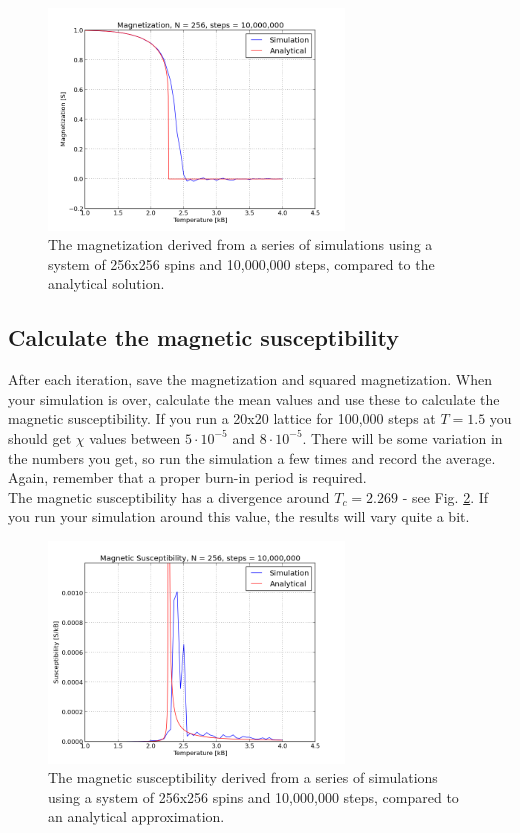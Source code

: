 \documentclass{article}
\begin{document}
\begin{figure}[p]
  \centering
  \includegraphics[width=0.7\textwidth]{mag_anal.png}
  \caption{The magnetization derived from a series of simulations using a system of
  256x256 spins and 10,000,000 steps, compared to the analytical solution.}
  \label{fig:magnetization}
\end{figure}


\subsection{Calculate the magnetic susceptibility}

After each iteration, save the magnetization and squared magnetization.
When your simulation is over, calculate the mean values and use these to
calculate the magnetic susceptibility.
If you run a 20x20 lattice for 100,000 steps
at $T = 1.5$ you should get $\chi$ values
between $5 \cdot 10^{-5}$ and $8 \cdot 10^{-5}$.
There will be some variation in the numbers you get,
so run the simulation a few times and record the average.
Again, remember that a proper burn-in period is required.\\

The magnetic susceptibility has a divergence around $T_c = 2.269$ - see Fig.
\ref{fig:susceptibility}.
If you run your simulation around this value,
the results will vary quite a bit.


\begin{figure}[htb]
  \centering
  \includegraphics[width=0.7\textwidth]{xi_anal.png}
  \caption{The magnetic susceptibility derived from a series of simulations using a
  system of 256x256 spins and 10,000,000 steps, compared to an analytical approximation.}
  \label{fig:susceptibility}
\end{figure}
\end{document}
